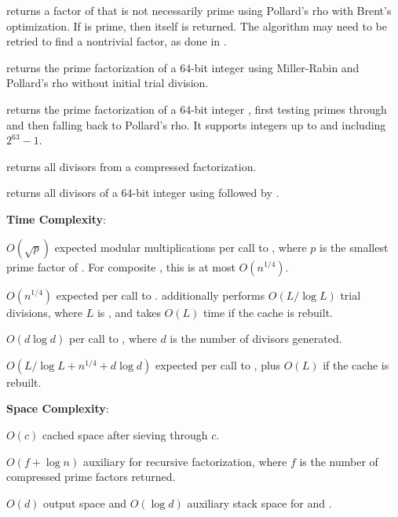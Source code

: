 \begin{compactitem}
  \item {} returns a factor of  that is not necessarily prime using Pollard's rho with Brent's optimization. If  is prime, then  itself is returned. The algorithm may need to be retried to find a nontrivial factor, as done in .
  \item {} returns the prime factorization of a 64-bit integer using Miller-Rabin and Pollard's rho without initial trial division.
  \item {} returns the prime factorization of a 64-bit integer , first testing primes through  and then falling back to Pollard's rho. It supports integers up to and including $2^{63} - 1$.
  \item {} returns all divisors from a compressed factorization.
  \item {} returns all divisors of a 64-bit integer using  followed by .
\end{compactitem}

\textbf{Time Complexity}:
\begin{compactitem}
  \item $O(\sqrt{p})$ expected modular multiplications per call to , where $p$ is the smallest prime factor of . For composite , this is at most $O(n^{1/4})$.
  \item $O(n^{1/4})$ expected per call to .  additionally performs $O(L/\log L)$ trial divisions, where $L$ is , and takes $O(L)$ time if the cache is rebuilt.
  \item $O(d \log d)$ per call to , where $d$ is the number of divisors generated.
  \item $O(L/\log L + n^{1/4} + d \log d)$ expected per call to , plus $O(L)$ if the cache is rebuilt.
\end{compactitem}

\textbf{Space Complexity}:
\begin{compactitem}
  \item $O(c)$ cached space after sieving through $c$.
  \item $O(f + \log n)$ auxiliary for recursive factorization, where $f$ is the number of compressed prime factors returned.
  \item $O(d)$ output space and $O(\log d)$ auxiliary stack space for  and .
\end{compactitem}

